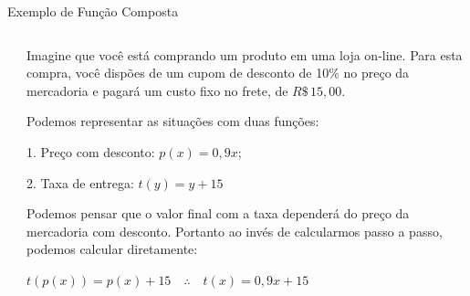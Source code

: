 \documentclass[aspectratio=169, t, 8pt]{beamer}
\begin{document}
    \begin{frame}{Exemplo de Função Composta}
        \begin{columns}[totalwidth=.9\textwidth]
            \begin{column}{.45\textwidth}
                
            \end{column}
            \begin{column}{.45\textwidth}
                Imagine que você está comprando um produto em uma loja on-line. Para esta compra, você dispões de um cupom de desconto de 10\% no preço da mercadoria e pagará um custo fixo no frete, de $R\$ \, 15,00$.

                \vspace{1.2em}

                Podemos representar as situações com duas funções:

                \vspace{1.2em}

                1. Preço com desconto: $p(x) = 0,9x$;

                2. Taxa de entrega: $t(y)=y+15$

                \vspace{1.2em}

                Podemos pensar que o valor final com a taxa dependerá do preço da mercadoria com desconto. Portanto ao invés de calcularmos passo a passo, podemos calcular diretamente:

                \vspace{1.2em}

                $t(p(x)) = p(x) + 15 \quad \therefore \quad t(x) = 0,9x + 15$
            \end{column}
        \end{columns}
    \end{frame}

\end{document}
